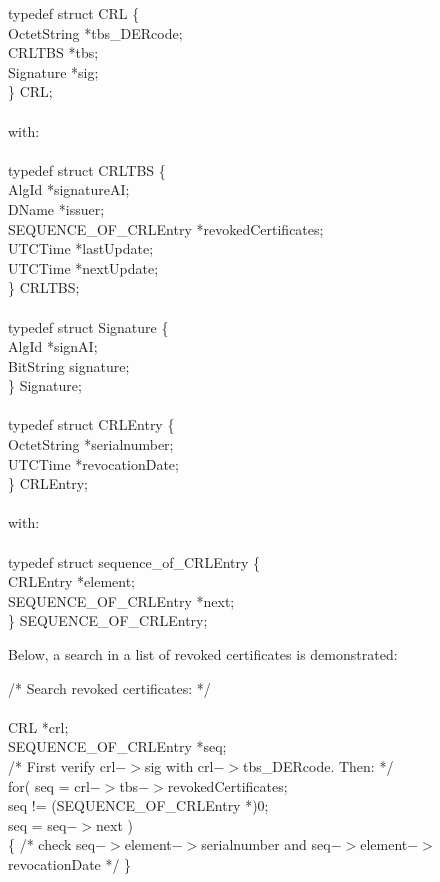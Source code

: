{\small
\btab
\1      typedef struct CRL \{  \\
\2              OctetString \5  *tbs\_DERcode; \\
\2              CRLTBS  \5   *tbs;        \\
\2              Signature \5    *sig; \\
\1      \} CRL;  \\ \\
with: \\ \\
\1      typedef struct CRLTBS \{ \\
\2              AlgId \5        *signatureAI; \\
\2              DName \5         *issuer; \\
\2              SEQUENCE\_OF\_CRLEntry \5     *revokedCertificates; \\
\2              UTCTime  \5     *lastUpdate; \\
\2              UTCTime  \5     *nextUpdate; \\
\1       \} CRLTBS; \\ \\
\1      typedef struct Signature \{  \\
\2              AlgId \5        *signAI; \\
\2              BitString \5    signature; \\
\1 \}           Signature;  \\ \\
\1      typedef struct CRLEntry \{ \\
\2              OctetString  \5          *serialnumber; \\
\2              UTCTime \5      *revocationDate; \\
\1      \} CRLEntry;  \\ \\
with: \\ \\
\1      typedef struct sequence\_of\_CRLEntry \{ \\
\2              CRLEntry          \5 *element; \\
\2              SEQUENCE\_OF\_CRLEntry \5 *next; \\
\1      \} SEQUENCE\_OF\_CRLEntry;  \\
\etab
}

Below, a search in a list of revoked certificates is demonstrated:

{\small
\btab
\1 /* Search revoked certificates: */ \\ \\
\1      CRL   \4 *crl;    \\
\1      SEQUENCE\_OF\_CRLEntry \4 *seq;  \\
\1      /* First verify crl$->$sig with crl$->$tbs\_DERcode. Then: */ \\
\1      for( seq = crl$->$tbs$->$revokedCertificates; \\
\2        seq != (SEQUENCE\_OF\_CRLEntry *)0; \\
\2        seq = seq$->$next ) \\
\1      \{ /* check seq$->$element$->$serialnumber and seq$->$element$->$revocationDate */ \} \\
\etab
}

